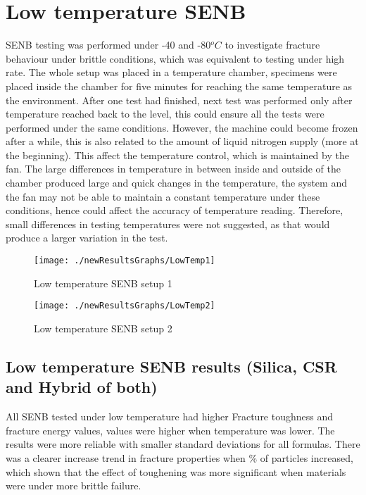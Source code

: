 \documentclass[numbers=noendperiod,chapterprefix=on]{icldt} %
\begin{document}
\section{Low temperature SENB}
SENB testing was performed under -40 and -80$^oC$ to investigate fracture behaviour under brittle conditions, which was equivalent to testing under high rate. The whole setup was placed in a temperature chamber, specimens were placed inside the chamber for five minutes for reaching the same temperature as the environment. After one test had finished, next test was performed only after temperature reached back to the level, this could ensure all the tests were performed under the same conditions. 
However, the machine could become frozen after a while, this is also related to the amount of liquid nitrogen supply (more at the beginning). This affect the temperature control, which is maintained by the fan. The large differences in temperature in between inside and outside of the chamber produced large and quick changes in the temperature, the system and the fan may not be able to maintain a constant temperature under these conditions, hence could affect the accuracy of temperature reading. Therefore, small differences in testing temperatures were not suggested, as that would produce a larger variation in the test.

\begin{figure}[!hp]
\centering
\texttt{[image: ./newResultsGraphs/LowTemp1]}
\caption{Low temperature SENB setup 1}
\end{figure}
\FloatBarrier
\begin{figure}[!h]
\centering
\texttt{[image: ./newResultsGraphs/LowTemp2]}
\caption{Low temperature SENB setup 2}
\end{figure}
\FloatBarrier
\newpage
\subsection{Low temperature SENB results (Silica, CSR and Hybrid of both)}
All SENB tested under low temperature had higher Fracture toughness and fracture energy values, values were higher when temperature was lower. The results were more reliable with smaller standard deviations for all formulas. There was a clearer increase trend in fracture properties when \% of particles increased, which shown that the effect of toughening was more significant when materials were under more brittle failure. 
\end{document}

